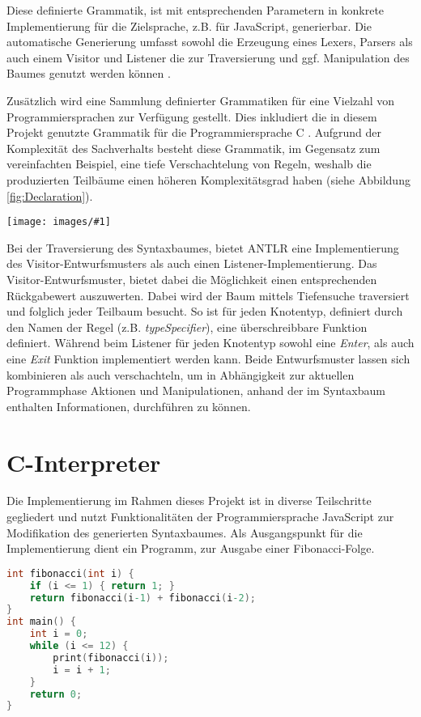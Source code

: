 \documentclass[]{lni}
\newcommand{\picSmall}[3]{
	\begin{figure*}
		\centering
		\texttt{[image: images/\#1]}
		\caption{#2}
		\label{fig:#3}       %
	\end{figure*}
}
\begin{document}
Diese definierte Grammatik, ist mit entsprechenden Parametern in konkrete Implementierung für die Zielsprache, z.B. für JavaScript, generierbar. Die automatische Generierung umfasst sowohl die Erzeugung eines Lexers, Parsers als auch einem Visitor und Listener die zur Traversierung und ggf. Manipulation des Baumes genutzt werden können \cite{antlr}.

Zusätzlich wird eine Sammlung definierter Grammatiken für eine Vielzahl von Programmiersprachen zur Verfügung gestellt. Dies inkludiert die in diesem Projekt genutzte Grammatik für die Programmiersprache C \cite{grammar}. Aufgrund der Komplexität des Sachverhalts besteht diese Grammatik, im Gegensatz zum vereinfachten Beispiel, eine tiefe Verschachtelung von Regeln, weshalb die produzierten Teilbäume einen höheren Komplexitätsgrad haben (siehe Abbildung \ref{fig:Declaration}).

\picSmall{declaration.png}{Erzeugter Teilbaum einer Variablendeklaration}{Declaration}

Bei der Traversierung des Syntaxbaumes, bietet ANTLR eine Implementierung des Visitor-Entwurfsmusters als auch einen Listener-Implementierung. Das Visitor-Entwurfsmuster, bietet dabei die Möglichkeit einen entsprechenden Rückgabewert auszuwerten. Dabei wird der Baum mittels Tiefensuche traversiert und folglich jeder Teilbaum besucht. So ist für jeden Knotentyp, definiert durch den Namen der Regel (z.B. \textit{typeSpecifier}), eine überschreibbare Funktion definiert. Während beim Listener für jeden Knotentyp sowohl eine \textit{Enter}, als auch eine \textit{Exit} Funktion implementiert werden kann. Beide Entwurfsmuster lassen sich kombinieren als auch verschachteln, um in Abhängigkeit zur aktuellen Programmphase Aktionen und Manipulationen, anhand der im Syntaxbaum enthalten Informationen, durchführen zu können.
\newpage
\section{C-Interpreter}
Die Implementierung im Rahmen dieses Projekt ist in diverse Teilschritte gegliedert und nutzt Funktionalitäten der Programmiersprache JavaScript zur Modifikation des generierten Syntaxbaumes. Als Ausgangspunkt für die Implementierung dient ein Programm, zur Ausgabe einer Fibonacci-Folge.

\begin{lstlisting}[language=C]
int fibonacci(int i) {
	if (i <= 1) { return 1; }
	return fibonacci(i-1) + fibonacci(i-2);
}
int main() {
	int i = 0;
	while (i <= 12) {
		print(fibonacci(i));
		i = i + 1;
	}
	return 0;
}

\end{lstlisting}
\end{document}
